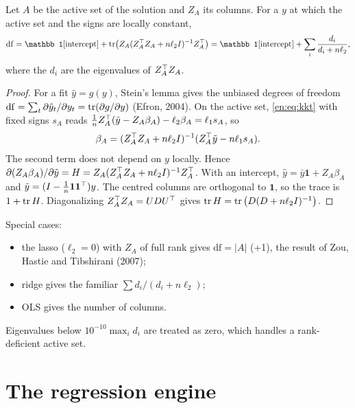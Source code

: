 \begin{proposition}\label{en:prop:df}
Let $A$ be the active set of the solution and $Z_A$ its columns. For a $y$ at which the
active set and the signs are locally constant,
\[
  \mathrm{df}=\mathbb 1[\text{intercept}]+\tr\!\big(Z_A(Z_A^\T Z_A+n\ell_2I)^{-1}Z_A^\T\big)
  =\mathbb 1[\text{intercept}]+\sum_i\frac{d_i}{d_i+n\ell_2},
\]
where the $d_i$ are the eigenvalues of $Z_A^\top Z_A$.
\end{proposition}
\begin{proof}
For a fit $\hat y=g(y)$, Stein's lemma gives the unbiased degrees of freedom
$\mathrm{df}=\sum_t\partial\hat y_t/\partial y_t=\operatorname{tr}(\partial g/\partial y)$ (Efron, 2004). On the active set, \eqref{en:eq:kkt} with fixed signs $s_A$ reads
$\frac1nZ_A^\top(\tilde y-Z_A\beta_A)-\ell_2\beta_A=\ell_1s_A$, so
\[
  \beta_A=(Z_A^\top Z_A+n\ell_2I)^{-1}(Z_A^\top\tilde y-n\ell_1s_A).
\]
The second term does not depend on $y$ locally. Hence
$\partial(Z_A\beta_A)/\partial\tilde y=H=Z_A(Z_A^\top Z_A+n\ell_2I)^{-1}Z_A^\top$. With an intercept,
$\hat y=\bar y\mathbf 1+Z_A\beta_A$ and $\tilde y=(I-\frac1n\mathbf 1\mathbf 1^\top)y$. The centred columns are
orthogonal to $\mathbf 1$, so the trace is $1+\operatorname{tr} H$. Diagonalizing $Z_A^\top Z_A=UDU^\top$ gives
$\operatorname{tr} H=\operatorname{tr}\big(D(D+n\ell_2I)^{-1}\big)$.
\end{proof}
Special cases:
\begin{itemize}
  \item the lasso ($\ell_2=0$) with $Z_A$ of full rank gives $\mathrm{df}=|A|$ (+1), the
        result of Zou, Hastie and Tibshirani (2007);
  \item ridge gives the familiar $\sum d_i/(d_i+n\ell_2)$;
  \item OLS gives the number of columns.
\end{itemize}
Eigenvalues below $10^{-10}\max_id_i$ are treated as zero, which handles a rank-deficient
active set.

\section{The regression engine}

